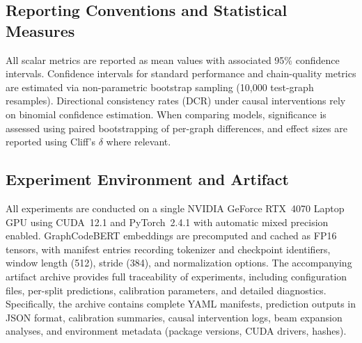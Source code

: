 \documentclass{buthesis}
\begin{document}
\begin{table}[H]
\centering
\small
\setlength{\tabcolsep}{6pt}
\renewcommand{\arraystretch}{1.12}
\caption{Training calibration and evaluation parameters.}
\label{tab:results-calib}
\end{table}


\subsection{Reporting Conventions and Statistical Measures}
\label{subsec:results-reporting}

All scalar metrics are reported as mean values with associated 95\% confidence intervals. Confidence intervals for standard performance and chain-quality metrics are estimated via non-parametric bootstrap sampling (10,000 test-graph resamples). Directional consistency rates (DCR) under causal interventions rely on binomial confidence estimation. When comparing models, significance is assessed using paired bootstrapping of per-graph differences, and effect sizes are reported using Cliff’s $\delta$ where relevant.

\subsection{Experiment Environment and Artifact}
\label{subsec:results-env}

All experiments are conducted on a single NVIDIA GeForce RTX~4070 Laptop GPU using CUDA~12.1 and PyTorch~2.4.1 with automatic mixed precision enabled. GraphCodeBERT embeddings are precomputed and cached as FP16 tensors, with manifest entries recording tokenizer and checkpoint identifiers, window length (512), stride (384), and normalization options. The accompanying artifact archive provides full traceability of experiments, including configuration files, per-split predictions, calibration parameters, and detailed diagnostics. Specifically, the archive contains complete YAML manifests, prediction outputs in JSON format, calibration summaries, causal intervention logs, beam expansion analyses, and environment metadata (package versions, CUDA drivers, hashes).
\end{document}
